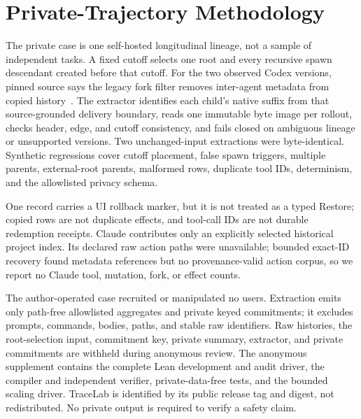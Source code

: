 \section{Private-Trajectory Methodology}
\label{app:private-trace}

The private case is one self-hosted longitudinal lineage, not a sample of
independent tasks.  A fixed cutoff selects one root and every recursive spawn
descendant created before that cutoff.  For the two observed Codex versions,
pinned source says the legacy fork filter removes inter-agent metadata from
copied history~\cite{codexspawn145,codexspawn146}.  The extractor identifies
each child's native suffix from that source-grounded delivery boundary, reads
one immutable byte image per rollout, checks header, edge, and cutoff
consistency, and fails closed on ambiguous lineage or unsupported versions.
Two unchanged-input extractions were byte-identical.  Synthetic regressions
cover cutoff placement, false spawn triggers, multiple parents, external-root
parents, malformed rows, duplicate tool IDs, determinism, and the allowlisted
privacy schema.

One record carries a UI rollback marker, but it is not treated as a typed
Restore; copied rows are not duplicate effects, and tool-call IDs are not
durable redemption receipts.  Claude contributes only an explicitly selected
historical project index.  Its declared raw action paths were unavailable;
bounded exact-ID recovery found metadata references but no provenance-valid
action corpus, so we report no Claude tool, mutation, fork, or effect counts.

The author-operated case recruited or manipulated no users.  Extraction emits
only path-free allowlisted aggregates and private keyed commitments; it excludes
prompts, commands, bodies, paths, and stable raw identifiers.  Raw histories,
the root-selection input, commitment key, private summary, extractor, and
private commitments are withheld during anonymous review.  The anonymous
supplement contains the complete Lean development and audit driver, the
compiler and independent verifier, private-data-free tests, and the bounded
scaling driver.  TraceLab is identified by its public release tag and digest,
not redistributed.  No private output is required to verify a safety claim.
